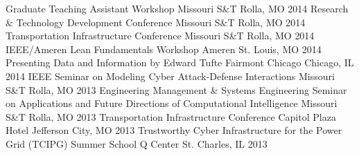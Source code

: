 \begin{cvhonors}
  \cvhonor
    {Graduate Teaching Assistant Workshop}
    {Missouri S\&T}
    {Rolla, MO}
    {2014}
  \cvhonor
    {Research \& Technology Development Conference}
    {Missouri S\&T}
    {Rolla, MO}
    {2014}
  \cvhonor
    {Transportation Infrastructure Conference}
    {Missouri S\&T}
    {Rolla, MO}
    {2014}
  \cvhonor
    {IEEE/Ameren Lean Fundamentals Workshop}
    {Ameren}
    {St. Louis, MO}
    {2014}
  \cvhonor
    {Presenting Data and Information by Edward Tufte}
    {Fairmont Chicago}
    {Chicago, IL}
    {2014}
  \cvhonor
    {IEEE Seminar on Modeling Cyber Attack-Defense Interactions}
    {Missouri S\&T}
    {Rolla, MO}
    {2013}
  \cvhonor
    {Engineering Management \& Systems Engineering Seminar on Applications and Future Directions of Computational Intelligence}
    {Missouri S\&T}
    {Rolla, MO}
    {2013}
  \cvhonor
    {Transportation Infrastructure Conference}
    {Capitol Plaza Hotel}
    {Jefferson City, MO}
    {2013}
  \cvhonor
    {Trustworthy Cyber Infrastructure for the Power Grid (TCIPG) Summer School}
    {Q Center}
    {St. Charles, IL}
    {2013}
\end{cvhonors}